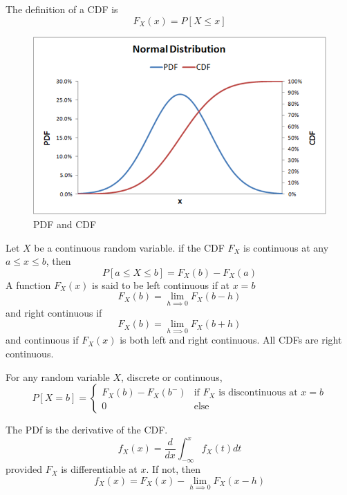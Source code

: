 The definition of a CDF is
\begin{equation}
    F_X(x) = P[X \leq x]
\end{equation}
\begin{figure}
    \centering
    \includegraphics[scale=0.5]{images/normal_distribution_plot.png}
    \caption{PDF and CDF}
\end{figure}
Let $X$ be a continuous random variable. if the CDF
$F_X$ is continuous at any $a\leq x \leq b$, then
\begin{equation}
    P[a \leq X \leq b] = F_X(b) - F_X(a)
\end{equation}
A function $F_X(x)$ is said to be left
continuous if at $x=b$
\begin{equation}
    F_X(b) = \lim_{h\implies 0} F_X(b-h)
\end{equation}
and right continuous if
\begin{equation}
    F_X(b) = \lim_{h\implies 0} F_X(b+h)
\end{equation}
and continuous if $F_X(x)$ is both left
and right continuous.
All CDFs are right continuous.

For any random variable $X$, discrete or continuous,
\begin{equation}
    P[X=b] = \begin{cases}
        F_X(b) - F_X(b^-) & \text{if $F_X$ is discontinuous at $x=b$} \\
        0                 & \text{else}
    \end{cases}
\end{equation}

The PDf is the derivative of the CDF.
\begin{equation}
    f_X(x) = \frac{d}{dx} \int_{-\infty}^{x} f_X(t)dt
\end{equation}
provided $F_X$ is differentiable at $x$. If not, then
\begin{equation}
    f_X(x) = F_X(x) - \lim_{h\implies 0} F_X(x-h)
\end{equation}

